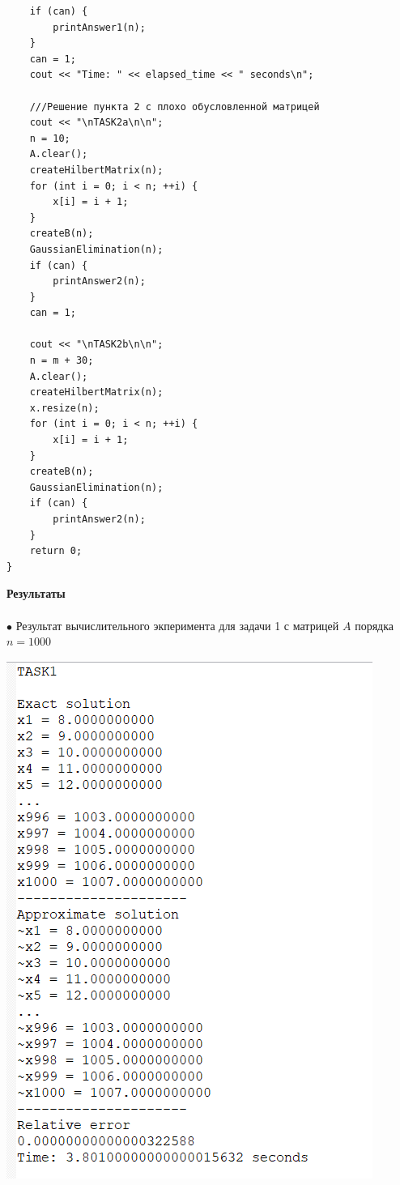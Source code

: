 \documentclass[a4paper, 12pt]{report}
\begin{document}
\begin{verbatim}
    if (can) {
        printAnswer1(n);
    }
    can = 1;
    cout << "Time: " << elapsed_time << " seconds\n";

    ///Решение пункта 2 с плохо обусловленной матрицей
    cout << "\nTASK2a\n\n";
    n = 10;
    A.clear();
    createHilbertMatrix(n);
    for (int i = 0; i < n; ++i) {
        x[i] = i + 1;
    }
    createB(n);
    GaussianElimination(n);
    if (can) {
        printAnswer2(n);
    }
    can = 1;

    cout << "\nTASK2b\n\n";
    n = m + 30;
    A.clear();
    createHilbertMatrix(n);
    x.resize(n);
    for (int i = 0; i < n; ++i) {
        x[i] = i + 1;
    }
    createB(n);
    GaussianElimination(n);
    if (can) {
        printAnswer2(n);
    }
    return 0;
}
   \end{verbatim}
   \newpage
   \textbf{\Huge{Результаты}}\\\\
   $\bullet$ Результат вычислительного экперимента для задачи 1 с матрицей $A$ порядка $n = 1000$\\
   \begin{center}
        \includegraphics[scale = 0.5]{pic1.png}
   \end{center}
\end{document}
